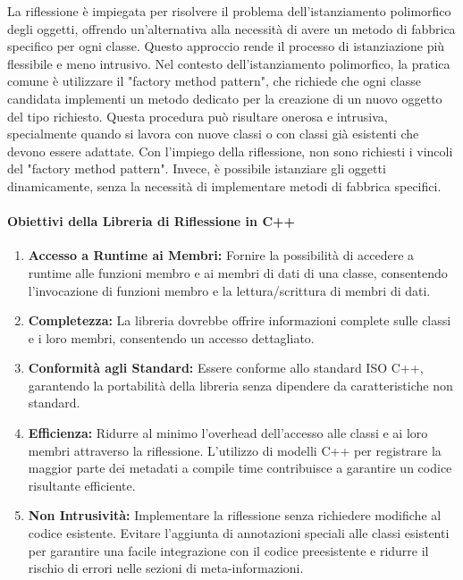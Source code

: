 \documentclass[11pt]{article}
\begin{document}
\begin{multicols*}{2}[\columnsep=1cm]
\begin{itemize}
    La riflessione è impiegata per risolvere il problema dell'istanziamento polimorfico degli oggetti, offrendo un'alternativa alla necessità di avere un metodo di fabbrica specifico per ogni classe. Questo approccio rende il processo di istanziazione più flessibile e meno intrusivo.
    Nel contesto dell'istanziamento polimorfico, la pratica comune è utilizzare il "factory method pattern", che richiede che ogni classe candidata implementi un metodo dedicato per la creazione di un nuovo oggetto del tipo richiesto. Questa procedura può risultare onerosa e intrusiva, specialmente quando si lavora con nuove classi o con classi già esistenti che devono essere adattate.
    Con l'impiego della riflessione, non sono richiesti i vincoli del "factory method pattern". Invece, è possibile istanziare gli oggetti dinamicamente, senza la necessità di implementare metodi di fabbrica specifici.
    \end{itemize}
    \paragraph{Obiettivi della Libreria di Riflessione in C++}

    \begin{enumerate}
        \item \textbf{Accesso a Runtime ai Membri:} Fornire la possibilità di accedere a runtime alle funzioni membro e ai membri di dati di una classe, consentendo l'invocazione di funzioni membro e la lettura/scrittura di membri di dati.
    
        \item \textbf{Completezza:} La libreria dovrebbe offrire informazioni complete sulle classi e i loro membri, consentendo un accesso dettagliato.
    
        \item \textbf{Conformità agli Standard:} Essere conforme allo standard ISO C++, garantendo la portabilità della libreria senza dipendere da caratteristiche non standard.
    
        \item \textbf{Efficienza:} Ridurre al minimo l'overhead dell'accesso alle classi e ai loro membri attraverso la riflessione. L'utilizzo di modelli C++ per registrare la maggior parte dei metadati a compile time contribuisce a garantire un codice risultante efficiente.
    
        \item \textbf{Non Intrusività:} Implementare la riflessione senza richiedere modifiche al codice esistente. Evitare l'aggiunta di annotazioni speciali alle classi esistenti per garantire una facile integrazione con il codice preesistente e ridurre il rischio di errori nelle sezioni di meta-informazioni.
    \end{enumerate}


\end{multicols*}
\end{document}
